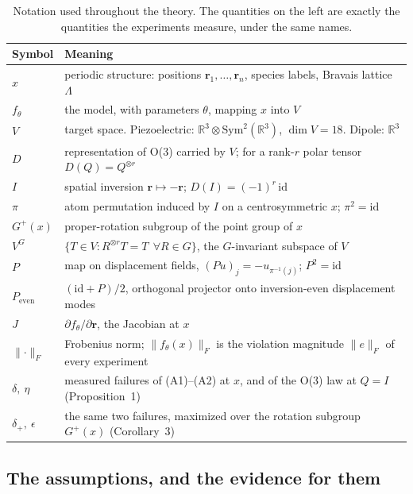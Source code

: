\begin{table}[htbp]
\centering
\caption{Notation used throughout the theory. The quantities on the left are exactly the quantities the experiments measure, under the same names.}
\label{stab:notation}
\fontsize{8bp}{10bp}\selectfont
\begin{tabular}{@{}ll@{}}
\toprule
Symbol & Meaning \\
\midrule
$x$ & periodic structure: positions $\mathbf{r}_1,\dots,\mathbf{r}_n$, species labels, Bravais lattice $\Lambda$ \\
$f_\theta$ & the model, with parameters $\theta$, mapping $x$ into $V$ \\
$V$ & target space. Piezoelectric: $\mathbb{R}^{3}\otimes\mathrm{Sym}^{2}(\mathbb{R}^{3})$, $\dim V = 18$. Dipole: $\mathbb{R}^{3}$ \\
$D$ & representation of O(3) carried by $V$; for a rank-$r$ polar tensor $D(Q) = Q^{\otimes r}$ \\
$I$ & spatial inversion $\mathbf{r}\mapsto-\mathbf{r}$; $D(I) = (-1)^{r}\,\mathrm{id}$ \\
$\pi$ & atom permutation induced by $I$ on a centrosymmetric $x$; $\pi^{2}=\mathrm{id}$ \\
$G^{+}(x)$ & proper-rotation subgroup of the point group of $x$ \\
$V^{G}$ & $\{T\in V : R^{\otimes r}T = T\ \ \forall R\in G\}$, the $G$-invariant subspace of $V$ \\
$P$ & map on displacement fields, $(Pu)_j = -u_{\pi^{-1}(j)}$; $P^{2}=\mathrm{id}$ \\
$P_{\mathrm{even}}$ & $(\mathrm{id}+P)/2$, orthogonal projector onto inversion-even displacement modes \\
$J$ & $\partial f_\theta/\partial\mathbf{r}$, the Jacobian at $x$ \\
$\lVert\cdot\rVert_F$ & Frobenius norm; $\lVert f_\theta(x)\rVert_F$ is the violation magnitude $\lVert e\rVert_F$ of every experiment \\
$\delta,\ \eta$ & measured failures of (A1)--(A2) at $x$, and of the O(3) law at $Q=I$ (Proposition~1) \\
$\delta_{+},\ \epsilon$ & the same two failures, maximized over the rotation subgroup $G^{+}(x)$ (Corollary~3) \\
\bottomrule
\end{tabular}
\end{table}

\subsection*{The assumptions, and the evidence for them}

